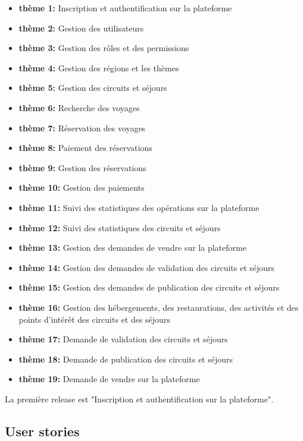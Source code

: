\documentclass[12pt]{report}
\begin{document}
				\begin{itemize}
					\item \textbf{thème 1:} Inscription et authentification sur la plateforme
					\item \textbf{thème 2:} Gestion des utilisateurs
					\item \textbf{thème 3:} Gestion des rôles et des permissions
					\item \textbf{thème 4:} Gestion des régions et les thèmes
					\item \textbf{thème 5:} Gestion des circuits et séjours
					\item \textbf{thème 6:} Recherche des voyages
					\item \textbf{thème 7:} Réservation des voyages
					\item \textbf{thème 8:} Paiement des réservations
					\item \textbf{thème 9:} Gestion des réservations
					\item \textbf{thème 10:} Gestion des paiements
					\item \textbf{thème 11:} Suivi des statistiques des opérations sur la plateforme
					\item \textbf{thème 12:} Suivi des statistiques des circuits et séjours
					\item \textbf{thème 13:} Gestion des demandes de vendre sur la plateforme
					\item \textbf{thème 14:} Gestion des demandes de validation des circuits et séjours
					\item \textbf{thème 15:} Gestion des demandes de publication des circuits et séjours
					\item \textbf{thème 16:} Gestion des hébergements, des restaurations, des activités et des points d'intérêt des circuits et des séjours
					\item \textbf{thème 17:} Demande de validation des circuits et séjours
					\item \textbf{thème 18:} Demande de publication des circuits et séjours
					\item \textbf{thème 19:} Demande de vendre sur la plateforme
				\end{itemize}

				La première release est "Inscription et authentification sur la plateforme".

				\subsection{User stories}
\end{document}
